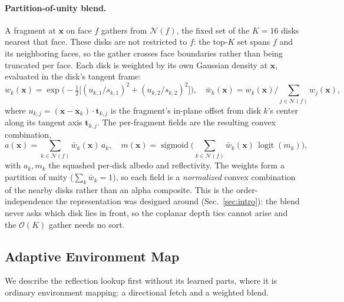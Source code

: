 \paragraph{Partition-of-unity blend.}
A fragment at $\mathbf{x}$ on face $f$ gathers from $\mathcal{N}(f)$, the fixed set of the $K{=}16$ disks nearest that face. These disks are not restricted to $f$: the top-$K$ set spans $f$ and its neighboring faces, so the gather crosses face boundaries rather than being truncated per face. Each disk is weighted by its own Gaussian density at $\mathbf{x}$, evaluated in the disk's tangent frame:
\begin{equation}
w_k(\mathbf{x}) = \exp\!\Big(-\tfrac12\big[(u_{k,1}/s_{k,1})^2 + (u_{k,2}/s_{k,2})^2\big]\Big), \quad
\bar{w}_k(\mathbf{x}) = w_k(\mathbf{x}) \Big/ \sum_{j\in\mathcal{N}(f)} w_j(\mathbf{x}),
\label{eq:pou}
\end{equation}
where $u_{k,j}=(\mathbf{x}-\mathbf{x}_k)\cdot\mathbf{t}_{k,j}$ is the fragment's in-plane offset from disk $k$'s center along its tangent axis $\mathbf{t}_{k,j}$. The per-fragment fields are the resulting convex combination,
\begin{equation}
a(\mathbf{x}) = \sum_{k\in\mathcal{N}(f)} \bar{w}_k(\mathbf{x})\, a_k,  \quad
m(\mathbf{x}) = \operatorname{sigmoid}\!\Big(\sum_{k\in\mathcal{N}(f)} \bar{w}_k(\mathbf{x})\, \operatorname{logit}(m_k)\Big),
\label{eq:blend}
\end{equation}
with $a_k,m_k$ the squashed per-disk albedo and reflectivity. The weights form a partition of unity
($\sum_k \bar{w}_k = 1$), so each field is a \emph{normalized} convex combination of the nearby
disks rather than an alpha composite. This is the order-independence the representation was designed
around (Sec.~\ref{sec:intro}): the blend never asks which disk lies in front, so the coplanar depth
ties cannot arise and the $\mathcal{O}(K)$ gather needs no sort.


\subsection{Adaptive Environment Map}
\label{sec:env}
We describe the reflection lookup first without its learned parts, where it is ordinary environment mapping: a directional fetch and a weighted blend.

